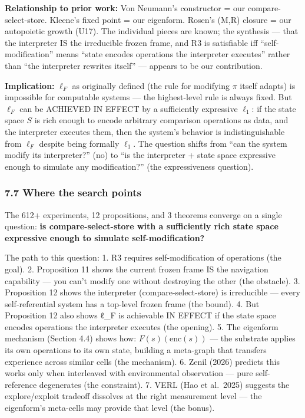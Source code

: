 \documentclass[
  11pt,
]{article}
\begin{document}
\textbf{Relationship to prior work:} Von Neumann's constructor = our
compare-select-store. Kleene's fixed point = our eigenform. Rosen's
(M,R) closure = our autopoietic growth (U17). The individual pieces are
known; the synthesis --- that the interpreter IS the irreducible frozen
frame, and R3 is satisfiable iff ``self-modification'' means ``state
encodes operations the interpreter executes'' rather than ``the
interpreter rewrites itself'' --- appears to be our contribution.

\textbf{Implication:} \(\ell_F\) as originally defined (the rule for
modifying \(\pi\) itself adapts) is impossible for computable systems
--- the highest-level rule is always fixed. But \(\ell_F\) can be
ACHIEVED IN EFFECT by a sufficiently expressive \(\ell_1\): if the state
space \(S\) is rich enough to encode arbitrary comparison operations as
data, and the interpreter executes them, then the system's behavior is
indistinguishable from \(\ell_F\) despite being formally \(\ell_1\). The
question shifts from ``can the system modify its interpreter?'' (no) to
``is the interpreter + state space expressive enough to simulate any
modification?'' (the expressiveness question).

\subsubsection{7.7 Where the search
points}\label{where-the-search-points}

The 612+ experiments, 12 propositions, and 3 theorems converge on a
single question: \textbf{is compare-select-store with a sufficiently
rich state space expressive enough to simulate self-modification?}

The path to this question: 1. R3 requires self-modification of
operations (the goal). 2. Proposition 11 shows the current frozen frame
IS the navigation capability --- you can't modify one without destroying
the other (the obstacle). 3. Proposition 12 shows the interpreter
(compare-select-store) is irreducible --- every self-referential system
has a top-level frozen frame (the bound). 4. But Proposition 12 also
shows ℓ\_F is achievable IN EFFECT if the state space encodes operations
the interpreter executes (the opening). 5. The eigenform mechanism
(Section 4.4) shows how: \(F(s)(\text{enc}(s))\) --- the substrate
applies its own operations to its own state, building a meta-graph that
transfers experience across similar cells (the mechanism). 6. Zenil
(2026) predicts this works only when interleaved with environmental
observation --- pure self-reference degenerates (the constraint). 7.
VERL (Hao et al.~2025) suggests the explore/exploit tradeoff dissolves
at the right measurement level --- the eigenform's meta-cells may
provide that level (the bonus).
\end{document}
